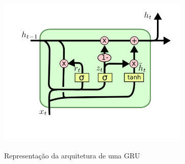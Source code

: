 \begin{figure}[htbp]
    \centering
    \includegraphics[scale=1.0]{monography/img/models/GRU.png}
    \label{figure:gru}
    \caption[Representação da arquitetura de uma GRU]{Representação da arquitetura de uma GRU\footnotemark}
\end{figure}